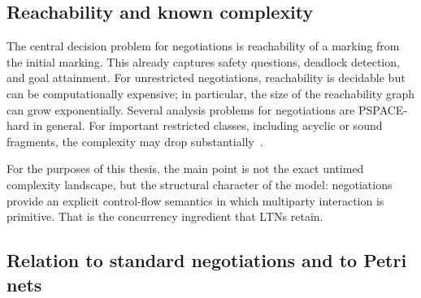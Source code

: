 \subsection{Reachability and known complexity}
\label{subsec:prelim-neg-complexity}

The central decision problem for negotiations is reachability of a marking from the initial marking. This already captures safety questions, deadlock detection, and goal attainment. For unrestricted negotiations, reachability is decidable but can be computationally expensive; in particular, the size of the reachability graph can grow exponentially. Several analysis problems for negotiations are PSPACE-hard in general. For important restricted classes, including acyclic or sound fragments, the complexity may drop substantially~\cite{EsparzaDeselNegotiations,EsparzaWorkflow,EsparzaFreeChoice}.

For the purposes of this thesis, the main point is not the exact untimed complexity landscape, but the structural character of the model: negotiations provide an explicit control-flow semantics in which multiparty interaction is primitive. That is the concurrency ingredient that LTNs retain.

\subsection{Relation to standard negotiations and to Petri nets}
\label{subsec:prelim-neg-relations}




